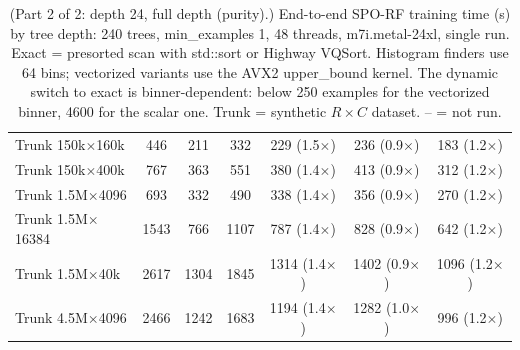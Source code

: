 \begin{table}[p]
\begin{tabular}{l|ccc|ccc}
        Trunk 150k$\times$160k & 446 & 211 & 332 & 229 (1.5$\times$) & 236 (0.9$\times$) & 183 (1.2$\times$) \\
        Trunk 150k$\times$400k & 767 & 363 & 551 & 380 (1.4$\times$) & 413 (0.9$\times$) & 312 (1.2$\times$) \\
        Trunk 1.5M$\times$4096 & 693 & 332 & 490 & 338 (1.4$\times$) & 356 (0.9$\times$) & 270 (1.2$\times$) \\
        Trunk 1.5M$\times$16384 & 1543 & 766 & 1107 & 787 (1.4$\times$) & 828 (0.9$\times$) & 642 (1.2$\times$) \\
        Trunk 1.5M$\times$40k & 2617 & 1304 & 1845 & 1314 (1.4$\times$) & 1402 (0.9$\times$) & 1096 (1.2$\times$) \\
        Trunk 4.5M$\times$4096 & 2466 & 1242 & 1683 & 1194 (1.4$\times$) & 1282 (1.0$\times$) & 996 (1.2$\times$) \\
        \hline
    \end{tabular}
    \caption{(Part 2 of 2: depth 24, full depth (purity).) End-to-end SPO-RF training time (s) by tree depth: 240 trees, min\_examples 1, 48 threads, m7i.metal-24xl, single run. Exact = presorted scan with std::sort or Highway VQSort. Histogram finders use 64 bins; vectorized variants use the AVX2 upper\_bound kernel. The dynamic switch to exact is binner-dependent: below 250 examples for the vectorized binner, 4600 for the scalar one. Trunk = synthetic $R\times C$ dataset. -- = not run.}
    \label{tab:overall-p2}
\end{table}
